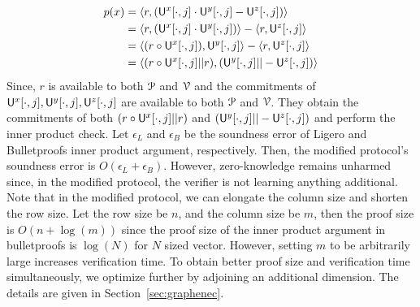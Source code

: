 \begin{align*}
p(x) & = \langle r,(\mathsf{U}^x[\cdot,j] \cdot \mathsf{U}^y[\cdot,j] - \mathsf{U}^z[\cdot,j])\rangle \\
& = \langle r,(\mathsf{U}^x[\cdot,j] \cdot \mathsf{U}^y[\cdot,j])\rangle - \langle r,\mathsf{U}^z[\cdot,j]\rangle \\
& = \langle (r \circ \mathsf{U}^x[\cdot,j]), \mathsf{U}^y[\cdot,j]\rangle - \langle r,\mathsf{U}^z[\cdot,j]\rangle \\
& = \langle (r \circ \mathsf{U}^x[\cdot,j] || r),(  \mathsf{U}^y[\cdot,j] || - \mathsf{U}^z[\cdot,j])\rangle \\
\end{align*}
Since, $r$ is available to both $\mathcal{P}$ and $\mathcal{V}$ and the commitments of $ \mathsf{U}^x[\cdot,j],  \mathsf{U}^y[\cdot,j],  \mathsf{U}^z[\cdot,j]$ are available to both $\mathcal{P}$ and $\mathcal{V}$. They obtain the commitments of both $(r \circ \mathsf{U}^x[\cdot,j] || r)$ and $ (\mathsf{U}^y[\cdot,j] || - \mathsf{U}^z[\cdot,j] )$ and perform the inner product check.
Let $\epsilon_L$ and $\epsilon_B$ be the soundness error of Ligero and Bulletproofs inner product argument, respectively. Then, the modified protocol's soundness error is $O(\epsilon_L + \epsilon_B)$. However, zero-knowledge remains unharmed since, in the modified protocol, the verifier is not learning anything additional. 
Note that in the modified protocol, we can elongate the column size and shorten the row size. Let the row size be $n$, and the column size be $m$, then the proof size is $O(n + \log (m))$ since the proof size of the inner product argument in bulletproofs is $\log (N)$ for $N$ sized vector.
However, setting $m$ to be arbitrarily large increases verification time. 
To obtain better proof size and verification time simultaneously, we optimize further by adjoining an additional dimension. The details are given in Section~\ref{sec:graphenec}.

